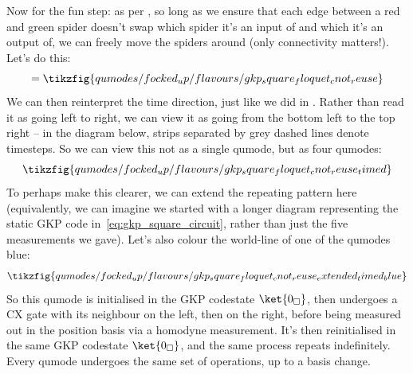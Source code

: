Now for the fun step: as per , so long as we ensure that each edge between a red and green spider doesn't swap which spider it's an input of and which it's an output of, we can freely move the spiders around (only connectivity matters!).
Let's do this:
\begin{equation}
    = \tikzfig{qumodes/focked_up/flavours/gkp_square_floquet_cnot_reuse}
\end{equation}
We can then reinterpret the time direction, just like we did in .
Rather than read it as going left to right, we can view it as going from the bottom left to the top right -- in the diagram below, strips separated by grey dashed lines denote timesteps.
So we can view this not as a single qumode, but as four qumodes:
\begin{equation}
    \tikzfig{qumodes/focked_up/flavours/gkp_square_floquet_cnot_reuse_timed}
\end{equation}
To perhaps make this clearer, we can extend the repeating pattern here (equivalently, we can imagine we started with a longer diagram representing the static GKP code in~\eqref{eq:gkp_square_circuit}, rather than just the five measurements we gave).
Let's also colour the world-line of one of the qumodes blue:
\begin{equation}
    \tikzfig{qumodes/focked_up/flavours/gkp_square_floquet_cnot_reuse_extended_timed_blue}
\end{equation}
So this qumode is initialised in the GKP codestate $\ket{0_\square}$, then undergoes a CX gate with its neighbour on the left, then on the right, before being measured out in the position basis via a homodyne measurement.
It's then reinitialised in the same GKP codestate $\ket{0_\square}$, and the same process repeats indefinitely.
Every qumode undergoes the same set of operations, up to a basis change.

